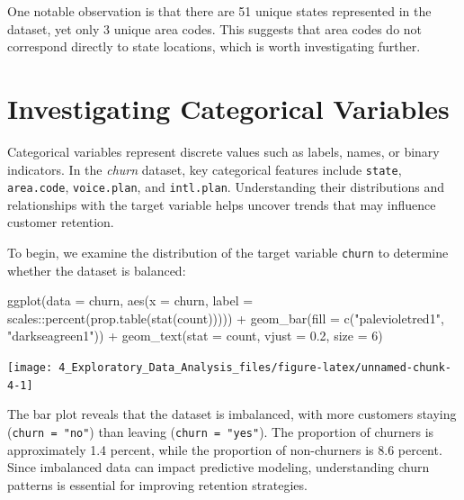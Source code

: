 \documentclass[
  11pt,
]{book}
\makeatletter
\newenvironment{Shaded}{}{}
\newcommand{\AttributeTok}[1]{#1}
\newcommand{\DecValTok}[1]{#1}
\newcommand{\FloatTok}[1]{#1}
\newcommand{\FunctionTok}[1]{#1}
\newcommand{\NormalTok}[1]{#1}
\newcommand{\SpecialCharTok}[1]{\textcolor[rgb]{0.39,0.39,0.39}{#1}}
\newcommand{\StringTok}[1]{\textcolor[rgb]{0.39,0.39,0.39}{#1}}
\newenvironment{kframe}{%
\medskip{}
\setlength{\fboxsep}{.8em}
 \def\at@end@of@kframe{}%
 \ifinner\ifhmode%
  \def\at@end@of@kframe{\end{minipage}}%
  \begin{minipage}{\columnwidth}%
 \fi\fi%
 \def\FrameCommand##1{\hskip\@totalleftmargin \hskip-\fboxsep
 \colorbox{shadecolor}{##1}\hskip-\fboxsep
     \hskip-\linewidth \hskip-\@totalleftmargin \hskip\columnwidth}%
 \MakeFramed {\advance\hsize-\width
   \@totalleftmargin\z@ \linewidth\hsize
   \@setminipage}}%
 {\par\unskip\endMakeFramed%
 \at@end@of@kframe}
\renewenvironment{Shaded}{\begin{kframe}}{\end{kframe}}
\theoremstyle{definition}
\theoremstyle{definition}
\theoremstyle{definition}
\theoremstyle{definition}
\theoremstyle{remark}
\makeatother
\begin{document}
One notable observation is that there are 51 unique states represented in the dataset, yet only 3 unique area codes. This suggests that area codes do not correspond directly to state locations, which is worth investigating further.

\section{Investigating Categorical Variables}\label{chapter-EDA-categorical}

Categorical variables represent discrete values such as labels, names, or binary indicators. In the \emph{churn} dataset, key categorical features include \texttt{state}, \texttt{area.code}, \texttt{voice.plan}, and \texttt{intl.plan}. Understanding their distributions and relationships with the target variable helps uncover trends that may influence customer retention.

To begin, we examine the distribution of the target variable \texttt{churn} to determine whether the dataset is balanced:

\begin{Shaded}
\begin{Highlighting}[]
\FunctionTok{ggplot}\NormalTok{(}\AttributeTok{data =}\NormalTok{ churn, }\FunctionTok{aes}\NormalTok{(}\AttributeTok{x =}\NormalTok{ churn, }\AttributeTok{label =}\NormalTok{ scales}\SpecialCharTok{::}\FunctionTok{percent}\NormalTok{(}\FunctionTok{prop.table}\NormalTok{(}\FunctionTok{stat}\NormalTok{(count))))) }\SpecialCharTok{+}
  \FunctionTok{geom\_bar}\NormalTok{(}\AttributeTok{fill =} \FunctionTok{c}\NormalTok{(}\StringTok{"palevioletred1"}\NormalTok{, }\StringTok{"darkseagreen1"}\NormalTok{)) }\SpecialCharTok{+} 
  \FunctionTok{geom\_text}\NormalTok{(}\AttributeTok{stat =} \StringTok{\textquotesingle{}count\textquotesingle{}}\NormalTok{, }\AttributeTok{vjust =} \FloatTok{0.2}\NormalTok{, }\AttributeTok{size =} \DecValTok{6}\NormalTok{)}
\end{Highlighting}
\end{Shaded}

\begin{center}\texttt{[image: 4\_Exploratory\_Data\_Analysis\_files/figure-latex/unnamed-chunk-4-1]} \end{center}

The bar plot reveals that the dataset is imbalanced, with more customers staying (\texttt{churn\ =\ "no"}) than leaving (\texttt{churn\ =\ "yes"}). The proportion of churners is approximately 1.4 percent, while the proportion of non-churners is 8.6 percent. Since imbalanced data can impact predictive modeling, understanding churn patterns is essential for improving retention strategies.
\end{document}
